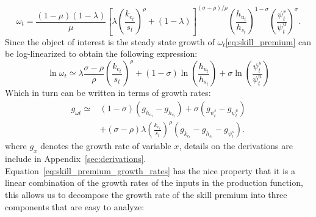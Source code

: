 \documentclass[12pt]{article}
\begin{document}
\begin{equation}\label{eq:skill_premium}
 \omega_{t}=\frac{(1-\mu)(1-\lambda)}{\mu}\left[\lambda\left(\frac{k_{e_t}}{s_{t}}\right)^{\rho}+(1-\lambda)\right]^{(\sigma-\rho) / \rho}\left(\frac{h_{u_t}}{h_{s_t}}\right)^{1-\sigma}\left(\frac{\psi^s_t}{\psi^u_t}\right)^{\sigma} .
\end{equation}
Since the object of interest is the steady state growth of $\omega_t$\eqref{eq:skill_premium} can be log-linearized to obtain the following expression:
\begin{equation}\label{eq:skill_premium_log_linear}
 \ln \omega_{t} \simeq \lambda \frac{\sigma-\rho}{\rho}\left(\frac{k_{e_t}}{s_{t}}\right)^{\rho}+(1-\sigma) \ln \left(\frac{h_{u_t}}{h_{s_t}}\right)+\sigma \ln \left(\frac{\psi^s_t}{\psi^u_t}\right)
\end{equation}
Which in turn can be written in terms of growth rates:
\begin{equation}\label{eq:skill_premium_growth_rates}
 \begin{aligned}
 g_{\omega t} \simeq &(1-\sigma)\left(g_{h_{u_t}}-g_{h_{s_t}}\right)+\sigma\left(g_{\psi^s_t}-g_{\psi^u_t}\right) \\
 &+(\sigma-\rho) \lambda\left(\frac{k_{e_t}}{s_{t}}\right)^{\rho}\left(g_{k_{e_t}}-g_{h_{s_t}}-g_{\psi^s_t}\right) .
 \end{aligned}
\end{equation}
where $g_x$ denotes the growth rate of variable $x$, details on the derivations are include in Appendix~\ref{sec:derivations}. Equation~\eqref{eq:skill_premium_growth_rates} has the nice property that it is a linear combination of the growth rates of the inputs in the production function, this allows us to decompose the growth rate of the skill premium into three components that are easy to analyze:
\end{document}

